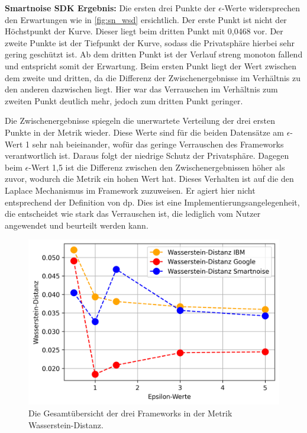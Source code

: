\textbf{Smartnoise SDK Ergebnis:}
Die ersten drei Punkte der $\epsilon$-Werte widersprechen den Erwartungen wie in \cref{fig:sn_wsd} ersichtlich. Der erste Punkt ist nicht der Höchstpunkt der Kurve. Dieser liegt beim dritten Punkt mit 0,0468 vor. Der zweite Punkte ist der Tiefpunkt der Kurve, sodass die Privatsphäre hierbei sehr gering geschützt ist. Ab dem dritten Punkt ist der Verlauf streng monoton fallend und entspricht somit der Erwartung. Beim ersten Punkt liegt der Wert zwischen dem zweite und dritten, da die Differenz der Zwischenergebnisse im Verhältnis zu den anderen dazwischen liegt. Hier war das Verrauschen im Verhältnis zum zweiten Punkt deutlich mehr, jedoch zum dritten Punkt geringer.

Die Zwischenergebnisse spiegeln die unerwartete Verteilung der drei ersten Punkte in der Metrik wieder. Diese Werte sind für die beiden Datensätze am $\epsilon$-Wert 1 sehr nah beieinander, wofür das geringe Verrauschen des Frameworks verantwortlich ist. Daraus folgt der niedrige Schutz der Privatsphäre. Dagegen beim $\epsilon$-Wert 1,5 ist die Differenz zwischen den Zwischenergebnissen höher als zuvor, wodurch die Metrik ein hohen Wert hat. Dieses Verhalten ist auf die den Laplace Mechanismus im Framework zuzuweisen. Er agiert hier nicht entsprechend der Definition von \gls{dp}. Dies ist eine Implementierungsangelegenheit, die entscheidet wie stark das Verrauschen ist, die lediglich vom Nutzer angewendet und beurteilt werden kann.

\begin{figure}[htbp]
	\centering
	\includegraphics[scale=0.6]{./images/together_wsd.png}
	\caption{Die Gesamtübersicht der drei Frameworks in der Metrik Wasserstein-Distanz.}
	\label{fig:together_wsd}
\end{figure}


